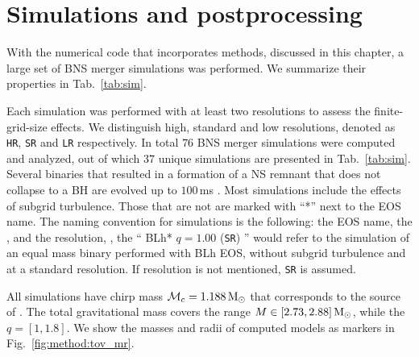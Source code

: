 \section{Simulations and postprocessing}


With the numerical code \wisky{} that incorporates methods, 
discussed in this chapter, a large set of \ac{BNS} merger 
simulations was performed. We summarize their properties in 
Tab.~\ref{tab:sim}. 
%



Each simulation was performed with at least two resolutions to assess the 
finite-grid-size effects. We distinguish high, standard and low resolutions, 
denoted as \texttt{HR}, \texttt{SR} and \texttt{LR} respectively. 
%
In total $76$ \ac{BNS} merger simulations were computed and analyzed, 
out of which $37$ unique simulations are presented in Tab.~\ref{tab:sim}. 
%
%
%
Several binaries that resulted in a formation of a \ac{NS} remnant 
that does not collapse to a \ac{BH} are evolved up to $100\,$ms \pmerg.
%
Most simulations include the effects of subgrid turbulence. 
Those that are not are marked with ``*'' next to the \ac{EOS} name.
%
The naming convention for simulations is the following: 
the \ac{EOS} name, the \mr{}, and the resolution, \eg, 
the `` BLh* $q=1.00$ (\texttt{SR}) '' would refer to the simulation of an 
equal mass binary performed with BLh \ac{EOS}, without subgrid 
turbulence and at a standard resolution. 
If resolution is not mentioned, \texttt{SR} is assumed.

All simulations have chirp mass $\mathcal{M}_c = 1.188\,{\text{M}_{\odot}}$ 
that corresponds to the source of \GW{}. The total gravitational mass covers 
the range $M\in[2.73, 2.88]\,{\text{M}_{\odot}}$, while the \mr{} $q=[1,1.8]$. 
%
We show the masses and radii of computed models as markers in 
Fig.~\ref{fig:method:tov_mr}.

